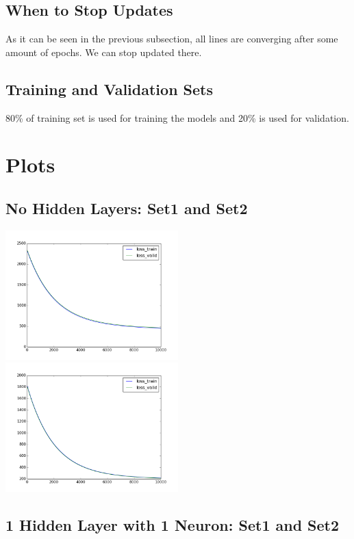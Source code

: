 \documentclass[conference]{IEEEtran}
\begin{document}
\subsection{When to Stop Updates}

As it can be seen in the previous subsection, all lines are converging after some amount of epochs. We can stop updated there.


\subsection{Training and Validation Sets}

80\% of training set is used for training the models and 20\% is used for validation.


\section{Plots}

\subsection{No Hidden Layers: Set1 and Set2}

\includegraphics[width=0.5\textwidth]{set1-[].png}
\includegraphics[width=0.5\textwidth]{set2-[].png}


\subsection{1 Hidden Layer with 1 Neuron: Set1 and Set2}
\end{document}
